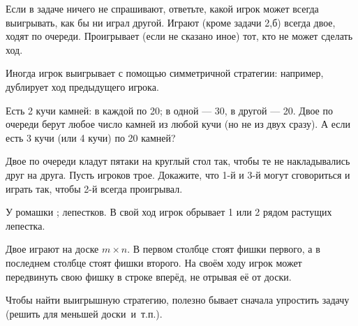 \documentclass[11pt,a4paper]{article}
\begin{document}

{\small {\noindent} Если %
в задаче ничего не спрашивают,
ответьте, какой игрок может всегда выигрывать,
как бы ни играл другой.
Играют (кроме задачи 2,б) всегда двое, ходят по очереди.
Проигрывает (если не сказано иное) тот, кто не может
сделать ход.
}


\vspace*{-1truemm}

{\small Иногда игрок выигрывает с помощью
 симметричной стратегии: например, дублирует ход предыдущего
игрока.}

\vspace*{1truemm}

Есть 2 кучи камней:
\!\!  \!\! в каждой по 20;
\!\!  \!\! в одной --- 30, в другой --- 20.
Двое по очереди берут любое число камней из
любой кучи (но не из двух сразу). %
 А если есть 3 кучи (или 4 кучи) по 20 камней?

 Двое по очереди кладут пятаки на круглый
стол так, чтобы те не накладывались друг на друга.
 Пусть игроков трое. Докажите, что 1-й и 3-й могут сговориться и играть так,
чтобы 2-й всегда проигрывал.


У ромашки \!\!\!  \!\!; \!\!  \! лепестков. В свой ход игрок
обрывает 1 или 2 рядом растущих лепестка.

Двое играют на доске $m\times n$. В первом
столбце стоят фишки первого, а в последнем столбце стоят фишки
второго. На своём ходу игрок может передвинуть свою фишку в
строке вперёд, не отрывая её от доски.


\vspace*{-1truemm}

{\small
Чтобы найти выигрышную стратегию, полезно бывает сначала упростить задачу (решить для меньшей доски~и~т.п.).
}
\end{document}
